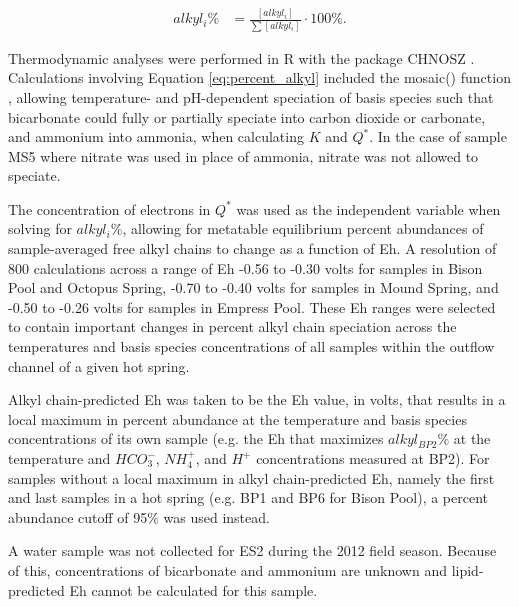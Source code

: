 \begin{equation} \label{eq:percent_alkyl}
\begin{split}
alkyl_{i}\% & = \frac{[alkyl_{i}]}{\sum{[alkyl_{i}]}} \cdot 100\%.
\end{split}
\end{equation}

Thermodynamic analyses were performed in R with the package CHNOSZ \citep{dick2008calculation}. Calculations involving Equation \ref{eq:percent_alkyl} included the mosaic() function \citep{dick2017equilibrium}, allowing temperature- and pH-dependent speciation of basis species such that bicarbonate could fully or partially speciate into carbon dioxide or carbonate, and ammonium into ammonia, when calculating $K$ and $Q^{*}$. In the case of sample MS5 where nitrate was used in place of ammonia, nitrate was not allowed to speciate.

The concentration of electrons in $Q^{*}$ was used as the independent variable when solving for $alkyl_{i}\%$, allowing for metatable equilibrium percent abundances of sample-averaged free alkyl chains to change as a function of Eh. A resolution of 800 calculations across a range of Eh -0.56 to -0.30 volts for samples in Bison Pool and Octopus Spring, -0.70 to -0.40 volts for samples in Mound Spring, and -0.50 to -0.26 volts for samples in Empress Pool. These Eh ranges were selected to contain important changes in percent alkyl chain speciation across the temperatures and basis species concentrations of all samples within the outflow channel of a given hot spring.

Alkyl chain-predicted Eh was taken to be the Eh value, in volts, that results in a local maximum in percent abundance at the temperature and basis species concentrations of its own sample (e.g. the Eh that maximizes $alkyl_{BP2}\%$ at the temperature and $HCO_{3}^{-}$, $NH_{4}^{+}$, and $H^{+}$ concentrations measured at BP2). For samples without a local maximum in alkyl chain-predicted Eh, namely the first and last samples in a hot spring (e.g. BP1 and BP6 for Bison Pool), a percent abundance cutoff of 95\% was used instead.

A water sample was not collected for ES2 during the 2012 field season. Because of this, concentrations of bicarbonate and ammonium are unknown and lipid-predicted Eh cannot be calculated for this sample.

